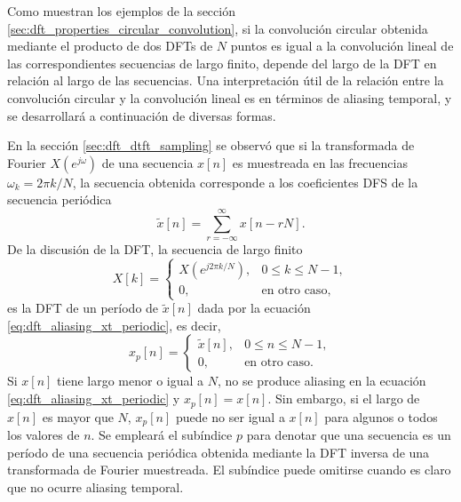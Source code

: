 \documentclass[a4paper]{report}
\begin{document}
Como muestran los ejemplos de la sección \ref{sec:dft_properties_circular_convolution}, si la convolución circular obtenida mediante el producto de dos DFTs de \(N\) puntos es igual a la convolución lineal de las correspondientes secuencias de largo finito, depende del largo de la DFT en relación al largo de las secuencias. Una interpretación útil de la relación entre la convolución circular y la convolución lineal es en términos de aliasing temporal, y se desarrollará a continuación de diversas formas.

En la sección \ref{sec:dft_dtft_sampling} se observó que si la transformada de Fourier \(X(e^{j\omega})\) de una secuencia \(x[n]\) es muestreada en las frecuencias \(\omega_k=2\pi k/N\), la secuencia obtenida corresponde a los coeficientes DFS de la secuencia periódica
\begin{equation}\label{eq:dft_aliasing_xt_periodic}
 \tilde{x}[n]=\sum_{r=-\infty}^\infty x[n-rN]. 
\end{equation}
De la discusión de la DFT, la secuencia de largo finito 
\[
 X[k]=
 \left\{ 
 \begin{array}{ll}
  X(e^{j2\pi k/N}), & 0\leq k\leq N-1,\\
  0, & \textrm{en otro caso,}
 \end{array}
 \right. 
\]
es la DFT de un período de \(\tilde{x}[n]\) dada por la ecuación \ref{eq:dft_aliasing_xt_periodic}, es decir,
\[
 x_p[n]=
 \left\{ 
 \begin{array}{ll}
  \tilde{x}[n], & 0\leq n\leq N-1,\\
  0, & \textrm{en otro caso.}
 \end{array}
 \right.
\]
Si \(x[n]\) tiene largo menor o igual a \(N\), no se produce aliasing en la ecuación \ref{eq:dft_aliasing_xt_periodic} y \(x_p[n]=x[n]\). Sin embargo, si el largo de \(x[n]\) es mayor que \(N\), \(x_p[n]\) puede no ser igual a \(x[n]\) para algunos o todos los valores de \(n\). Se empleará el subíndice \(p\) para denotar que una secuencia es un período de una secuencia periódica obtenida mediante la DFT inversa de una transformada de Fourier muestreada. El subíndice puede omitirse cuando es claro que no ocurre aliasing temporal.
\end{document}
